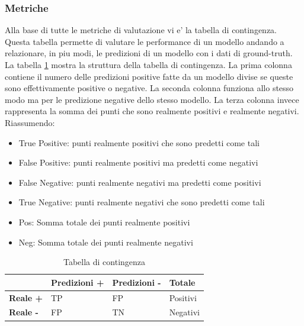 \subsubsection{Metriche}
Alla base di tutte le metriche di valutazione vi e' la tabella di contingenza. Questa tabella permette di valutare le performance di un modello andando a relazionare, in piu modi, le predizioni di un modello con i dati di ground-truth.
La tabella \ref{contigency-table} mostra la struttura della tabella di contingenza.  La prima colonna contiene il numero delle predizioni positive fatte da un modello divise se queste sono effettivamente positive o negative. La seconda colonna funziona allo stesso modo ma per le predizione negative dello stesso modello. La terza colonna invece rappresenta la somma dei punti che sono realmente positivi e realmente negativi.
Riassumendo:
\begin{itemize}
\item True Positive: punti realmente positivi che sono predetti come tali
\item False Positive: punti realmente positivi ma predetti come negativi
\item False Negative: punti realmente negativi ma predetti come positivi
\item True Negative: punti realmente negativi che sono predetti come tali
\item Pos: Somma totale dei punti realmente positivi
\item Neg: Somma totale dei punti realmente negativi
\end{itemize}

\begin{table}[]
\centering
	\caption{\label{contigency-table}Tabella di contingenza}

\begin{tabular}{|l|l|l|l|}
\hline
                 & \textbf{Predizioni +} & \textbf{Predizioni -} & \textbf{Totale} \\ \hline
\textbf{Reale +} & TP                    & FP                    & Positivi        \\ \hline
\textbf{Reale -} & FP                    & TN                    & Negativi        \\ \hline
\end{tabular}
\end{table}

